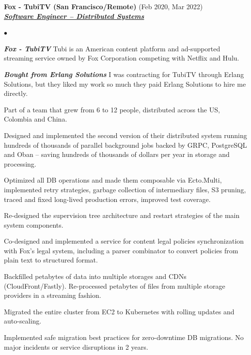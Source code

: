 \documentclass[a4paper]{article}
\newcommand{\employer}[3]{{
  \textbf{#1} (#2)\\ \underline{\textbf{\emph{#3}}}\\ }}
\newenvironment{achievements}{\begin{list}{$\bullet$}{\topsep 0pt \itemsep
  -2pt}}{\vspace*{4pt}\end{list}}
\newcommand{\emphasys}[1]{\textbf{\emph{#1}}}
\begin{document}
  \employer{ Fox - TubiTV (San Francisco/Remote)}{Feb 2020, Mar 2022}{Software Engineer -- Distributed Systems}
  \begin{achievements}
  \item \emphasys{Fox - TubiTV} Tubi is an American content platform and ad-supported streaming service owned by Fox Corporation competing with Netflix and Hulu.
  \item \emphasys{Bought from Erlang Solutions} I was contracting for TubiTV through Erlang Solutions, but they liked my work so much they paid Erlang Solutions to hire me directly.
  \item Part of a team that grew from 6 to 12 people, distributed across the US, Colombia and China.
  \item Designed and implemented the second version of their distributed system running hundreds of thousands of parallel background jobs backed by GRPC, PostgreSQL and Oban -- saving hundreds of thousands of dollars per year in storage and processing.
  \item Optimized all DB operations and made them composable via Ecto.Multi, implemented retry strategies, garbage collection of intermediary files, S3 pruning, traced and fixed long-lived production errors, improved test coverage.
  \item Re-designed the supervision tree architecture and restart strategies of the main system components.
  \item Co-designed and implemented a service for content legal policies synchronization with Fox's legal system, including a parser combinator to convert policies from plain text to structured format.
  \item Backfilled petabytes of data into multiple storages and CDNs (CloudFront/Fastly). Re-processed petabytes of files from multiple storage providers in a streaming fashion.
  \item Migrated the entire cluster from EC2 to Kubernetes with rolling updates and auto-scaling.
  \item Implemented safe migration best practices for zero-downtime DB migrations. No major incidents or service disruptions in 2 years.
  \end{achievements}
\end{document}
